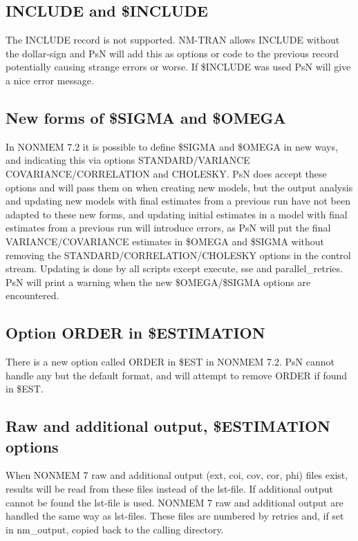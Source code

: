 	\subsection{INCLUDE and \$INCLUDE}
	The INCLUDE record is not supported. NM-TRAN allows INCLUDE without the dollar-sign and PsN will add this as options or code to the previous record potentially causing strange errors or worse. If \$INCLUDE was used PsN will give a nice error message.
	
	\subsection{New forms of \$SIGMA and \$OMEGA}
	In NONMEM 7.2 it is possible to define \$SIGMA and \$OMEGA in new ways, and indicating this via options STANDARD/VARIANCE COVARIANCE/CORRELATION and CHOLESKY. PsN does accept these options and will pass them on when creating new models, but the output analysis and updating new models with final estimates from a previous run have not been adapted to these new forms, and updating initial estimates in a model with final estimates from a previous run will introduce errors, as PsN will put the final VARIANCE/COVARIANCE estimates
	in \$OMEGA and \$SIGMA without removing the STANDARD/CORRELATION/CHOLESKY options in the control stream. Updating is done by all scripts except execute, sse and parallel\_retries. PsN will print a warning when the new \$OMEGA/\$SIGMA options are encountered.
	
	\subsection{Option ORDER in \$ESTIMATION}
	There is a new option called ORDER in \$EST in NONMEM 7.2. PsN cannot handle any but the default format, and will attempt to remove ORDER if found in \$EST.
	
	\subsection{Raw and additional output, \$ESTIMATION options}
	
	When NONMEM 7 raw and additional output (ext, coi, cov, cor, phi) files exist, results will be read from these files instead of the lst-file. If additional output cannot be found the lst-file is used. NONMEM 7 raw and additional output are handled the same way as lst-files. These files are numbered by retries and, if set in nm\_output, copied back to the calling directory.
	

